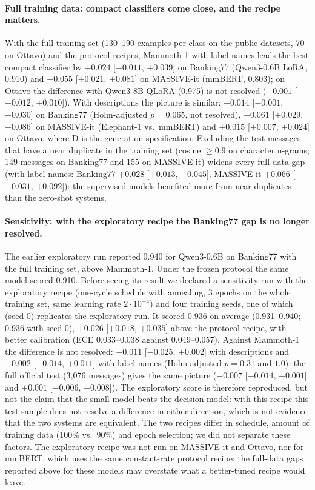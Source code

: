 \paragraph{Full training data: compact classifiers come close, and the recipe matters.} With the full training set (130--190 examples per
class on the public datasets, 70 on Ottavo) and the protocol recipes, Mammoth-1 with label names leads the best compact classifier by
$+0.024$ [$+0.011$, $+0.039$] on Banking77 (Qwen3-0.6B LoRA, 0.910) and $+0.055$ [$+0.021$, $+0.081$] on MASSIVE-it (mmBERT, 0.803); on
Ottavo the difference with Qwen3-8B QLoRA (0.975) is not resolved ($-0.001$ [$-0.012$, $+0.010$]). With descriptions the picture is
similar: $+0.014$ [$-0.001$, $+0.030$] on Banking77 (Holm-adjusted $p=0.065$, not resolved), $+0.061$ [$+0.029$, $+0.086$] on MASSIVE-it
(Elephant-1 vs.\ mmBERT) and $+0.015$ [$+0.007$, $+0.024$] on Ottavo, where D is the generation specification. Excluding the test messages
that have a near duplicate in the training set (cosine $\geq 0.9$ on character n-grams; 149 messages on Banking77 and 155 on MASSIVE-it)
widens every full-data gap (with label names: Banking77 $+0.028$ [$+0.013$, $+0.045$], MASSIVE-it $+0.066$ [$+0.031$, $+0.092$]): the
supervised models benefited more from near duplicates than the zero-shot systems.

\paragraph{Sensitivity: with the exploratory recipe the Banking77 gap is no longer resolved.} The earlier exploratory run reported 0.940 for
Qwen3-0.6B on Banking77 with the full training set, above Mammoth-1. Under the frozen protocol the same model scored 0.910. Before
seeing its result we declared a sensitivity run with the exploratory recipe (one-cycle schedule with annealing, 3 epochs on the whole
training set, same learning rate $2\cdot10^{-4}$) and four training seeds, one of which (seed 0) replicates the exploratory run. It scored
0.936 on average (0.931--0.940; 0.936 with seed 0), $+0.026$ [$+0.018$, $+0.035$] above the protocol recipe, with better calibration (ECE
0.033--0.038 against 0.049--0.057). Against Mammoth-1 the difference is not resolved: $-0.011$ [$-0.025$, $+0.002$] with descriptions and
$-0.002$ [$-0.014$, $+0.011$] with label names (Holm-adjusted $p=0.31$ and $1.0$); the full official test (3{,}076 messages) gives the same
picture ($-0.007$ [$-0.014$, $+0.001$] and $+0.001$ [$-0.006$, $+0.008$]). The exploratory score is therefore reproduced, but not the claim
that the small model beats the decision model: with this recipe this test sample does not resolve a difference in either direction,
which is not evidence that the two systems are equivalent. The two recipes differ in schedule, amount of training
data (100\% vs.\ 90\%) and epoch selection; we did not separate these factors. The exploratory recipe was not run on MASSIVE-it and
Ottavo, nor for mmBERT, which uses the same constant-rate protocol recipe: the full-data gaps reported above for these models may
overstate what a better-tuned recipe would leave.

